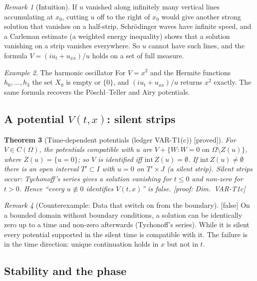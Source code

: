 \documentclass[11pt]{article}
\theoremstyle{plain}
\newtheorem{theorem}{Theorem}[section]
\theoremstyle{definition}
\theoremstyle{remark}
\newtheorem{remark}[theorem]{Remark}
\newtheorem{example}[theorem]{Example}
\newcommand{\badge}[2]{\textcolor{#1}{\textsf{\footnotesize[#2]}}}
\newcommand{\proved}[1][]{\badge{cC}{proved#1}}
\newcommand{\falsest}{\badge{cB}{false}}
\newcommand{\led}[1]{\textcolor{cG}{\textsf{\footnotesize(ledger #1)}}}
\newenvironment{intuition}{\begin{remark}[Intuition]}{\end{remark}}
\newcommand{\dimref}[1]{\textsf{\footnotesize[proof: Dim.~#1]}}
\newenvironment{falsebox}[2][]{\begin{remark}[Counterexample: #2]}{\end{remark}}
\begin{document}
\begin{intuition}
If $u$ vanished along infinitely many vertical lines accumulating at $x_0$, cutting $u$ off to the right of $x_0$ would give another strong solution that vanishes on a half-strip. Schr\"odinger waves have infinite speed, and a Carleman estimate (a weighted energy inequality) shows that a solution vanishing on a strip vanishes everywhere. So $u$ cannot have such lines, and the formula $V=(iu_t+u_{xx})/u$ holds on a set of full measure.
\end{intuition}

\begin{example}{The harmonic oscillator}
For $V=x^2$ and the Hermite functions $h_0,\dots,h_3$ the set $X_0$ is empty or $\{0\}$, and $(iu_t+u_{xx})/u$ returns $x^2$ exactly. The same formula recovers the P\"oschl--Teller and Airy potentials.
\end{example}

\subsection{A potential $V(t,x)$: silent strips}

\begin{theorem}[{Time-dependent potentials \led{VAR-T1(c)} \proved}]\label{thm:vart1c}
For $V\in C(\Omega)$, the potentials compatible with $u$ are $V+\{W:W=0\text{ on }\Omega\setminus Z(u)\}$, where $Z(u)=\{u=0\}$; so $V$ is identified iff $\mathrm{int}\,Z(u)=\emptyset$. If $\mathrm{int}\,Z(u)\ne\emptyset$ there is an open interval $T'\subset I$ with $u=0$ on $T'\times J$ (a \emph{silent strip}). Silent strips occur: Tychonoff's series gives a solution vanishing for $t\le0$ and non-zero for $t>0$. Hence ``every $u\not\equiv0$ identifies $V(t,x)$'' is false.
\dimref{VAR-T1c}
\end{theorem}

\begin{falsebox}{Data that switch on from the boundary}{\falsest}
On a bounded domain without boundary conditions, a solution can be identically zero up to a time and non-zero afterwards (Tychonoff's series). While it is silent every potential supported in the silent time is compatible with it. The failure is in the time direction: unique continuation holds in $x$ but not in $t$.
\end{falsebox}

\subsection{Stability and the phase}
\end{document}
